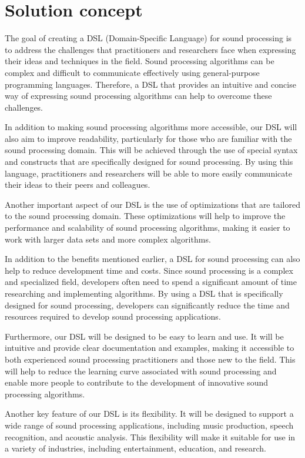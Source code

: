 \section{Solution concept} 
The goal of creating a DSL (Domain-Specific Language) for sound processing is to address the challenges that practitioners and researchers face when expressing their ideas and techniques in the field. Sound processing algorithms can be complex and difficult to communicate effectively using general-purpose programming languages. Therefore, a DSL that provides an intuitive and concise way of expressing sound processing algorithms can help to overcome these challenges.

In addition to making sound processing algorithms more accessible, our DSL will also aim to improve readability, particularly for those who are familiar with the sound processing domain. This will be achieved through the use of special syntax and constructs that are specifically designed for sound processing. By using this language, practitioners and researchers will be able to more easily communicate their ideas to their peers and colleagues.

Another important aspect of our DSL is the use of optimizations that are tailored to the sound processing domain. These optimizations will help to improve the performance and scalability of sound processing algorithms, making it easier to work with larger data sets and more complex algorithms.

In addition to the benefits mentioned earlier, a DSL for sound processing can also help to reduce development time and costs. Since sound processing is a complex and specialized field, developers often need to spend a significant amount of time researching and implementing algorithms. By using a DSL that is specifically designed for sound processing, developers can significantly reduce the time and resources required to develop sound processing applications.

Furthermore, our DSL will be designed to be easy to learn and use. It will be intuitive and provide clear documentation and examples, making it accessible to both experienced sound processing practitioners and those new to the field. This will help to reduce the learning curve associated with sound processing and enable more people to contribute to the development of innovative sound processing algorithms.

Another key feature of our DSL is its flexibility. It will be designed to support a wide range of sound processing applications, including music production, speech recognition, and acoustic analysis. This flexibility will make it suitable for use in a variety of industries, including entertainment, education, and research.

